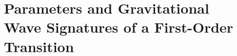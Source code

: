 \chapter{Parameters and Gravitational Wave Signatures of a First-Order Transition}
\label{ch:gw-signatures}

